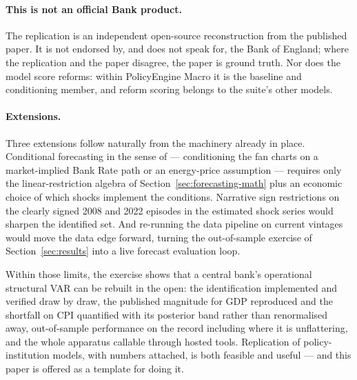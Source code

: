 \paragraph{This is not an official Bank product.} The replication is an independent open-source reconstruction from the published paper. It is not endorsed by, and does not speak for, the Bank of England; where the replication and the paper disagree, the paper is ground truth. Nor does the model score reforms: within PolicyEngine Macro it is the baseline and conditioning member, and reform scoring belongs to the suite's other models.

\paragraph{Extensions.} Three extensions follow naturally from the machinery already in place. Conditional forecasting in the sense of \citet{waggoner1999} --- conditioning the fan charts on a market-implied Bank Rate path or an energy-price assumption --- requires only the linear-restriction algebra of Section~\ref{sec:forecasting-math} plus an economic choice of which shocks implement the conditions. Narrative sign restrictions \citep{antolindiaz2018} on the clearly signed 2008 and 2022 episodes in the estimated shock series would sharpen the identified set. And re-running the data pipeline on current vintages would move the data edge forward, turning the out-of-sample exercise of Section~\ref{sec:results} into a live forecast evaluation loop.

\medskip

\noindent Within those limits, the exercise shows that a central bank's operational structural VAR can be rebuilt in the open: the identification implemented and verified draw by draw, the published magnitude for GDP reproduced and the shortfall on CPI quantified with its posterior band rather than renormalised away, out-of-sample performance on the record including where it is unflattering, and the whole apparatus callable through hosted tools. Replication of policy-institution models, with numbers attached, is both feasible and useful --- and this paper is offered as a template for doing it.
